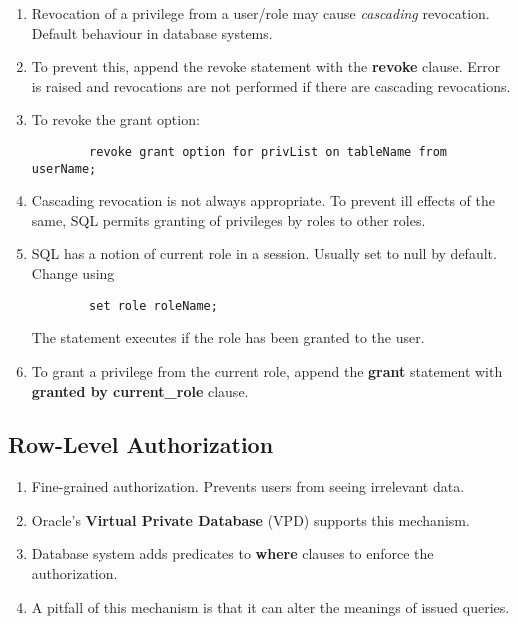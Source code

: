 \documentclass[journal,12pt,twocolumn]{IEEEtran}
\begin{document}
\begin{enumerate}
    \item Revocation of a privilege from a user/role may cause \textit{cascading}
    revocation. Default behaviour in database systems.
    \item To prevent this, append the revoke statement with the \textbf{revoke}
    clause. Error is raised and revocations are not performed if there are
    cascading revocations.
    \item To revoke the grant option:
    \begin{lstlisting}
        revoke grant option for privList on tableName from userName;
    \end{lstlisting}
    \item Cascading revocation is not always appropriate. To prevent ill effects
    of the same, SQL permits granting of privileges by roles to other roles.
    \item SQL has a notion of current role in a session. Usually set to null by 
    default. Change using
    \begin{lstlisting}
        set role roleName;
    \end{lstlisting}
    The statement executes if the role has been granted to the user.
    \item To grant a privilege from the current role, append the \textbf{grant}
    statement with \textbf{granted by current\_role} clause.
\end{enumerate}

\subsection{Row-Level Authorization}

\begin{enumerate}
    \item Fine-grained authorization. Prevents users from seeing irrelevant 
    data.
    \item Oracle's \textbf{Virtual Private Database} (VPD) supports this 
    mechanism.
    \item Database system adds predicates to \textbf{where} clauses to 
    enforce the authorization.
    \item A pitfall of this mechanism is that it can alter the meanings of
    issued queries.
\end{enumerate}
\end{document}
